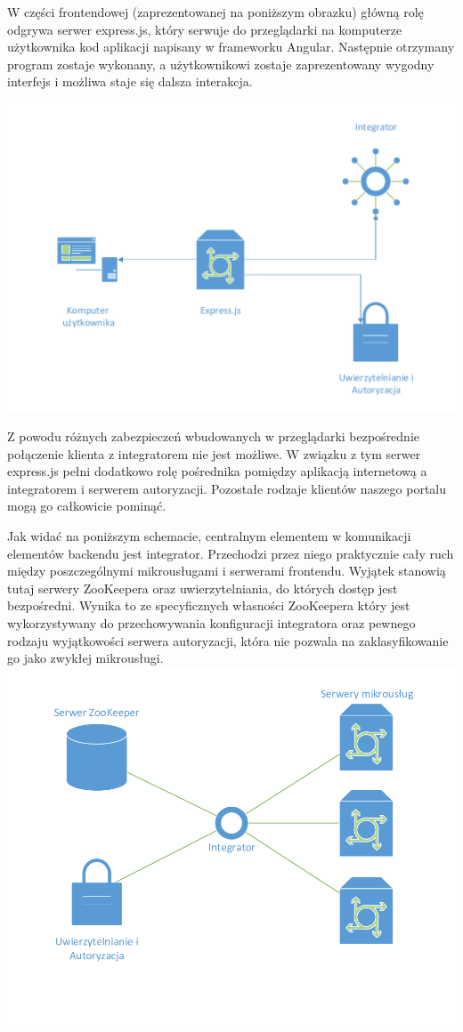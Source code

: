 \documentclass[licencjacka]{pracamgr}
\begin{document}
W części frontendowej (zaprezentowanej na poniższym obrazku) główną rolę odgrywa
serwer express.js, który serwuje do
przeglądarki na komputerze użytkownika kod aplikacji napisany w frameworku Angular.
Następnie otrzymany program zostaje wykonany, a użytkownikowi zostaje zaprezentowany
wygodny interfejs i możliwa staje się dalsza interakcja.

\includegraphics[width=\textwidth]{Frontend.pdf}

Z powodu różnych zabezpieczeń wbudowanych w przeglądarki bezpośrednie połączenie
klienta z integratorem nie jest możliwe. W związku z tym serwer express.js pełni
dodatkowo rolę pośrednika pomiędzy aplikacją internetową a integratorem i serwerem
autoryzacji. Pozostałe rodzaje klientów naszego portalu mogą go całkowicie pominąć.

Jak widać na poniższym schemacie, centralnym elementem w komunikacji elementów
backendu jest integrator. Przechodzi przez niego praktycznie cały ruch między
poszczególnymi mikrousługami i serwerami frontendu. Wyjątek stanowią tutaj serwery
ZooKeepera oraz uwierzytelniania, do których dostęp jest bezpośredni. Wynika to ze
specyficznych własności ZooKeepera który jest wykorzystywany do przechowywania
konfiguracji integratora oraz pewnego rodzaju wyjątkowości serwera autoryzacji,
która nie pozwala na zaklasyfikowanie go jako zwykłej mikrousługi.\\
\includegraphics[width=\textwidth]{backend.pdf}
\end{document}
